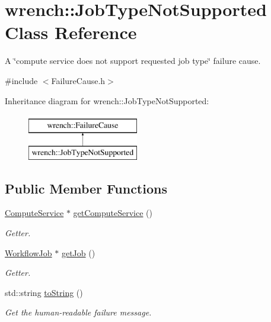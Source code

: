 \hypertarget{classwrench_1_1_job_type_not_supported}{}\section{wrench\+:\+:Job\+Type\+Not\+Supported Class Reference}
\label{classwrench_1_1_job_type_not_supported}


A \char`\"{}compute service does not support requested job type\char`\"{} failure cause.  




{\ttfamily \#include $<$Failure\+Cause.\+h$>$}

Inheritance diagram for wrench\+:\+:Job\+Type\+Not\+Supported\+:\begin{figure}[H]
\begin{center}
\leavevmode
\includegraphics[height=2.000000cm]{classwrench_1_1_job_type_not_supported}
\end{center}
\end{figure}
\subsection*{Public Member Functions}
\begin{DoxyCompactItemize}
\item 
\hyperlink{classwrench_1_1_compute_service}{Compute\+Service} $\ast$ \hyperlink{classwrench_1_1_job_type_not_supported_af2875bcec00418cd655609f1b4f12e55}{get\+Compute\+Service} ()
\begin{DoxyCompactList}\small\item\em Getter. \end{DoxyCompactList}\item 
\hyperlink{classwrench_1_1_workflow_job}{Workflow\+Job} $\ast$ \hyperlink{classwrench_1_1_job_type_not_supported_ade89cf1d1f2a676f5d552b909ef30e5e}{get\+Job} ()
\begin{DoxyCompactList}\small\item\em Getter. \end{DoxyCompactList}\item 
std\+::string \hyperlink{classwrench_1_1_job_type_not_supported_ab6a302367f2db332484da0c256e3ae5c}{to\+String} ()
\begin{DoxyCompactList}\small\item\em Get the human-\/readable failure message. \end{DoxyCompactList}\end{DoxyCompactItemize}
